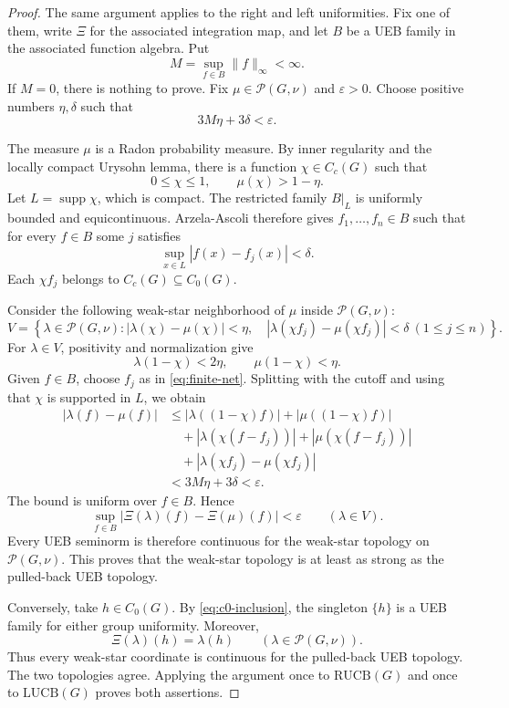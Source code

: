 \documentclass[11pt]{article}
\newcommand{\Prob}{\mathcal P}
\newcommand{\RUCB}{\mathrm{RUCB}}
\newcommand{\LUCB}{\mathrm{LUCB}}
\begin{document}
\begin{proof}
The same argument applies to the right and left uniformities.  Fix one of
them, write $\Xi$ for the associated integration map, and let $B$ be a UEB
family in the associated function algebra.  Put
\[
  M=\sup_{f\in B}\|f\|_\infty<\infty.
\]
If $M=0$, there is nothing to prove.  Fix $\mu\in\Prob(G,\nu)$ and
$\varepsilon>0$.  Choose positive numbers $\eta,\delta$ such that
\begin{equation}\label{eq:parameters}
  3M\eta+3\delta<\varepsilon.
\end{equation}

The measure $\mu$ is a Radon probability measure.  By inner regularity and
the locally compact Urysohn lemma, there is a function
$\chi\in C_c(G)$ such that
\[
  0\leq\chi\leq1,
  \qquad \mu(\chi)>1-\eta.
\]
Let $L=\operatorname{supp}\chi$, which is compact.  The restricted family
$B|_L$ is uniformly bounded and equicontinuous.  Arzela-Ascoli therefore
gives $f_1,\ldots,f_n\in B$ such that for every $f\in B$ some $j$ satisfies
\begin{equation}\label{eq:finite-net}
  \sup_{x\in L}|f(x)-f_j(x)|<\delta.
\end{equation}
Each $\chi f_j$ belongs to $C_c(G)\subseteq C_0(G)$.

Consider the following weak-star neighborhood of $\mu$ inside
$\Prob(G,\nu)$:
\[
  V=\left\{\lambda\in\Prob(G,\nu):
  |\lambda(\chi)-\mu(\chi)|<\eta,\quad
  |\lambda(\chi f_j)-\mu(\chi f_j)|<\delta
  \ (1\leq j\leq n)\right\}.
\]
For $\lambda\in V$, positivity and normalization give
\[
  \lambda(1-\chi)<2\eta,
  \qquad \mu(1-\chi)<\eta.
\]
Given $f\in B$, choose $f_j$ as in \eqref{eq:finite-net}.  Splitting with
the cutoff and using that $\chi$ is supported in $L$, we obtain
\begin{align*}
 |\lambda(f)-\mu(f)|
 &\leq |\lambda((1-\chi)f)|+|\mu((1-\chi)f)| \\
 &\quad +|\lambda(\chi(f-f_j))|+|\mu(\chi(f-f_j))| \\
 &\quad +|\lambda(\chi f_j)-\mu(\chi f_j)| \\
 &< 3M\eta+3\delta<\varepsilon.
\end{align*}
The bound is uniform over $f\in B$.  Hence
\[
  \sup_{f\in B}|\Xi(\lambda)(f)-\Xi(\mu)(f)|<\varepsilon
  \qquad(\lambda\in V).
\]
Every UEB seminorm is therefore continuous for the weak-star topology on
$\Prob(G,\nu)$.  This proves that the weak-star topology is at least as
strong as the pulled-back UEB topology.

Conversely, take $h\in C_0(G)$.  By \eqref{eq:c0-inclusion}, the singleton
$\{h\}$ is a UEB family for either group uniformity.  Moreover,
\[
  \Xi(\lambda)(h)=\lambda(h)
  \qquad(\lambda\in\Prob(G,\nu)).
\]
Thus every weak-star coordinate is continuous for the pulled-back UEB
topology.  The two topologies agree.  Applying the argument once to
$\RUCB(G)$ and once to $\LUCB(G)$ proves both assertions.
\end{proof}
\end{document}
